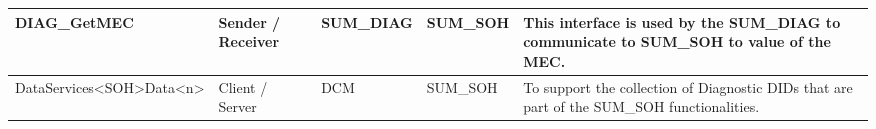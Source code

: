 \begin{longtable}{|l|l|l|l|l|}
\begin{minipage}{0.42\linewidth}\raggedright\vspace{.75ex}DIAG\_GetMEC\vspace{.75ex}\end{minipage} & \begin{minipage}{0.07\linewidth}\raggedright\vspace{.75ex}Sender / Receiver\vspace{.75ex}\end{minipage} & \begin{minipage}{0.10\linewidth}\raggedright\vspace{.75ex}SUM\_DIAG\vspace{.75ex}\end{minipage} & \begin{minipage}{0.10\linewidth}\raggedright\vspace{.75ex}SUM\_SOH\vspace{.75ex}\end{minipage} & \begin{minipage}{0.17\linewidth}\raggedright\vspace{.75ex}This interface is used by the SUM\_DIAG to communicate to SUM\_SOH to value of the MEC.\vspace{.75ex}\end{minipage}\\\hline
\begin{minipage}{0.42\linewidth}\raggedright\vspace{.75ex}DataServices<SOH>Data<n>\vspace{.75ex}\end{minipage} & \begin{minipage}{0.07\linewidth}\raggedright\vspace{.75ex}Client / Server\vspace{.75ex}\end{minipage} & \begin{minipage}{0.10\linewidth}\raggedright\vspace{.75ex}DCM\vspace{.75ex}\end{minipage} & \begin{minipage}{0.10\linewidth}\raggedright\vspace{.75ex}SUM\_SOH\vspace{.75ex}\end{minipage} & \begin{minipage}{0.17\linewidth}\raggedright\vspace{.75ex}To support the collection of Diagnostic DIDs that are part of the SUM\_SOH functionalities.\vspace{.75ex}\end{minipage}\\\hline

\end{longtable}
